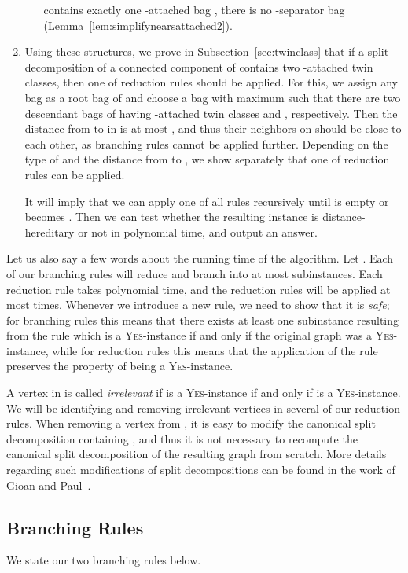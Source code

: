 \documentclass[11pt]{elsarticle}
\newcommand{\YES}{\textsc{Yes}}
\begin{document}
\begin{enumerate}
\begin{itemize}
 contains exactly one -attached bag ,
there is no -separator bag (Lemma~\ref{lem:simplifynearsattached2}).
\end{itemize}
\item Using these structures, we prove in Subsection~\ref{sec:twinclass} that if a split decomposition of a connected component of  contains two -attached twin classes, 
then one of reduction rules should be applied. 
For this, we assign any bag as a root bag  of  and 
choose a bag  with maximum  such that there are two descendant bags of  having -attached twin classes  and , respectively.
Then the distance from  to  in  is at most , and thus their neighbors on  should be close to each other, as branching rules cannot be applied further.
Depending on the type of  and the distance from  to , 
we show separately that one of reduction rules can be applied.


It will imply that we can apply one of all rules recursively until  is empty or  becomes .
Then we can test whether the resulting instance is distance-hereditary or not in polynomial time, and output an answer.
\end{enumerate}


Let us also say a few words about the running time of the algorithm. Let . Each of our branching rules will reduce  and branch into at most  subinstances.
Each reduction rule takes polynomial time, and the reduction rules will be applied at most  times. 
Whenever we introduce a new rule, we need to show that it is \emph{safe}; for branching rules this means that there exists at least one subinstance resulting from the rule which is a \YES-instance if and only if the original graph was a \YES-instance, while for reduction rules this means that the application of the rule preserves the property of being a \YES-instance.




A vertex  in  is called \emph{irrelevant} if  is a \YES-instance if and only if  is a \YES-instance. We will be identifying and removing irrelevant vertices in several of our reduction rules. When removing a vertex  from , it is easy to modify the canonical split decomposition containing , and thus it is not necessary to recompute the canonical split decomposition of the resulting graph from scratch.
More details regarding such modifications of split decompositions can be found in the work of Gioan and Paul~\cite{GP2012}.

\subsection{Branching Rules}\label{subsec:branching}
We state our two branching rules below.
\end{document}
